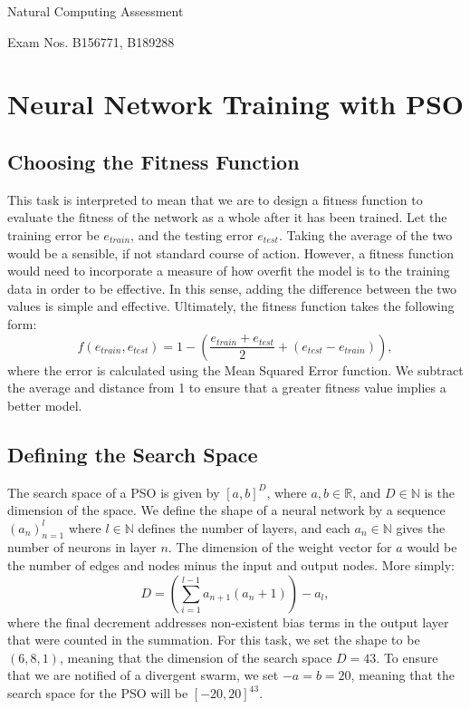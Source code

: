 \documentclass[12pt]{article}
\begin{document}
\vspace{-3em}
\small Natural Computing Assessment 


\small Exam Nos. B156771, B189288
\section{Neural Network Training with PSO}
\subsection{Choosing the Fitness Function}
This task is interpreted to mean that we are to design a fitness function to evaluate the fitness of the network as a whole after it has been trained.
Let the training error be $e_{train}$, and the testing error $e_{test}$. 
Taking the average of the two would be a sensible, if not standard course of action. 
However, a fitness function would need to incorporate a measure of how overfit the model is to the training data in order to be effective. 
In this sense, adding the difference between the two values is simple and effective. 
Ultimately, the fitness function takes the following form:
\begin{equation}
    f(e_{train}, e_{test}) = 1 - \left(\frac{e_{train} + e_{test}}{2} + \left(e_{test} - e_{train}\right)\right),
\end{equation}
where the error is calculated using the Mean Squared Error function. We subtract the average and distance from 1 to ensure that a greater fitness value implies a better model.

\subsection{Defining the Search Space}
The search space of a PSO is given by $[a,b]^D$, where $a,b\in \mathbb{R}$, and $D\in\mathbb{N}$ is the dimension of the space. 
We define the shape of a neural network by a sequence $(a_n)_{n=1}^{l}$ where $l\in\mathbb{N}$ defines the number of layers, and each $a_n \in \mathbb{N}$ gives the number of neurons in layer $n$. 
The dimension of the weight vector for $a$ would be the number of edges and nodes minus the input and output nodes. More simply:
\begin{equation}
    D = \left(\sum_{i=1}^{l-1} a_{n+1}\left(a_n + 1\right)\right) - a_l,
\end{equation}
where the final decrement addresses non-existent bias terms in the output layer that were counted in the summation. For this task, we set the shape to be $\left(6, 8, 1\right)$, meaning that the dimension of the search space $D=43$. 
To ensure that we are notified of a divergent swarm, we set $-a=b=20$, meaning that the search space for the PSO will be $\left[-20,20\right]^{43}$. 
\end{document}
